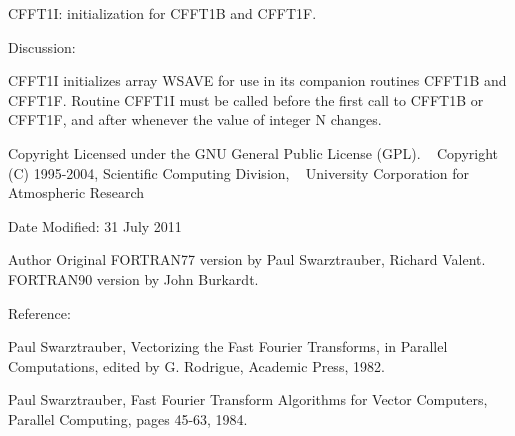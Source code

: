 C\+F\+F\+T1I\+: initialization for C\+F\+F\+T1B and C\+F\+F\+T1F. 

\begin{DoxyVerb}  Discussion:

    CFFT1I initializes array WSAVE for use in its companion routines 
    CFFT1B and CFFT1F.  Routine CFFT1I must be called before the first 
    call to CFFT1B or CFFT1F, and after whenever the value of integer 
    N changes.\end{DoxyVerb}
 \begin{DoxyCopyright}{Copyright}
Licensed under the G\+NU General Public License (G\+PL). ~\newline
 Copyright (C) 1995-\/2004, Scientific Computing Division, ~\newline
 University Corporation for Atmospheric Research 
\end{DoxyCopyright}
\begin{DoxyDate}{Date}
Modified\+: 31 July 2011 
\end{DoxyDate}
\begin{DoxyAuthor}{Author}
Original F\+O\+R\+T\+R\+A\+N77 version by Paul Swarztrauber, Richard Valent. ~\newline
 F\+O\+R\+T\+R\+A\+N90 version by John Burkardt.
\end{DoxyAuthor}
\begin{DoxyVerb}  Reference:

    Paul Swarztrauber,
    Vectorizing the Fast Fourier Transforms,
    in Parallel Computations,
    edited by G. Rodrigue,
    Academic Press, 1982.

    Paul Swarztrauber,
    Fast Fourier Transform Algorithms for Vector Computers,
    Parallel Computing, pages 45-63, 1984.\end{DoxyVerb}
 
